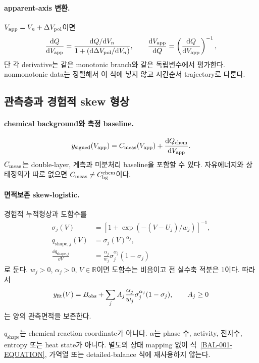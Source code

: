 \paragraph{ apparent-axis 변환.}
$V_{\mathrm{app}}=V_n+\Delta V_{\rm pol}$이면
\[
\frac{\mathrm d Q}{\mathrm d V_{\mathrm{app}}}
=
\frac{\mathrm d Q/\mathrm d V_n}
{1+(\mathrm d\Delta V_{\rm pol}/\mathrm d V_n)} ,
\qquad
\frac{\mathrm d V_{\mathrm{app}}}{\mathrm d Q}
=\left(\frac{\mathrm d Q}{\mathrm d V_{\mathrm{app}}}\right)^{-1},
\]
단 각 derivative는 같은 monotonic branch와 같은 독립변수에서
평가한다. nonmonotonic data는 정렬해서 이 식에 넣지 않고 시간순서
trajectory로 다룬다.

\subsection{관측층과 경험적 skew 형상}\label{OBS-CH1}

\paragraph{ chemical background와 측정 baseline.}
\begin{equation}
y_\mathrm{signed}(V_{\mathrm{app}})
=C_{\rm meas}(V_{\mathrm{app}})
+\frac{\mathrm d Q_{\mathrm{chem}}}{\mathrm d V_{\mathrm{app}}}.
\label{OBS-002-EQUATION}
\end{equation}
$C_{\rm meas}$는 double-layer, 계측과 미분처리 baseline을 포함할 수
있다. 자유에너지와 상태정의가 따로 없으면
$C_{\rm meas}\ne C_{\mathrm{bg}}^{\mathrm{chem}}$이다.

\paragraph{ 면적보존 skew-logistic.}
경험적 누적형상과 도함수를
\begin{align}
\sigma_j(V)&=[1+\exp(-(V-U_j)/w_j)]^{-1},\\
q_{\mathrm{shape},j}(V)&=\sigma_j(V)^{\alpha_j},\\
\frac{\dd q_{\mathrm{shape},j}}{\dd V}
&=\frac{\alpha_j}{w_j}\sigma_j^{\alpha_j}(1-\sigma_j)
\end{align}
로 둔다. $w_j>0$, $\alpha_j>0$, $V\in\mathbb R$이면 도함수는
비음이고 전 실수축 적분은 1이다. 따라서
\begin{equation}
y_\mathrm{fit}(V)
=B_{\mathrm{obs}}+\sum_j A_j\frac{\alpha_j}{w_j}
\sigma_j^{\alpha_j}(1-\sigma_j),\qquad A_j\ge0
\label{OBS-003-EQUATION}
\end{equation}
는 양의 관측면적을 보존한다.

\begin{validity}
$q_{\mathrm{shape}}$는 chemical reaction coordinate가 아니다.
$\alpha$는 phase 수, activity, 전자수, entropy 또는 heat state가
아니다. 별도의 상태 mapping 없이 식~\eqref{BAL-001-EQUATION},
가역열 또는 detailed-balance 식에 재사용하지 않는다.
\end{validity}

